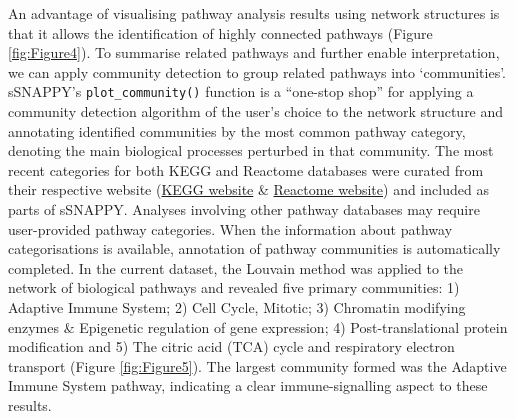\documentclass[9pt,a4paper,]{extarticle}
\begin{document}
An advantage of visualising pathway analysis results using network structures is that it allows the identification of highly connected pathways (Figure \ref{fig:Figure4}).
To summarise related pathways and further enable interpretation, we can apply community detection\citep{Newman2004} to group related pathways into `communities'.
sSNAPPY's \texttt{plot\_community()} function is a ``one-stop shop'' for applying a community detection algorithm of the user's choice to the network structure and annotating identified communities by the most common pathway category, denoting the main biological processes perturbed in that community.
The most recent categories for both KEGG and Reactome databases were curated from their respective website (\href{https://www.genome.jp/kegg/pathway.html}{KEGG website} \& \href{https://reactome.org/PathwayBrowser/\#/R-HSA-1632852&PATH=R-HSA-9612973}{Reactome website}) and included as parts of sSNAPPY.
Analyses involving other pathway databases may require user-provided pathway categories.
When the information about pathway categorisations is available, annotation of pathway communities is automatically completed.
In the current dataset, the Louvain method was applied to the network of biological pathways and revealed five primary communities: 1) Adaptive Immune System; 2) Cell Cycle, Mitotic; 3) Chromatin modifying enzymes \& Epigenetic regulation of gene expression; 4) Post-translational protein modification and 5) The citric acid (TCA) cycle and respiratory electron transport (Figure \ref{fig:Figure5}).
The largest community formed was the Adaptive Immune System pathway, indicating a clear immune-signalling aspect to these results.
\end{document}
